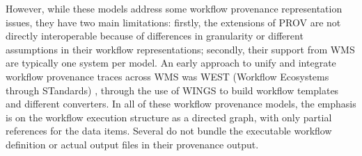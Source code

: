 \documentclass[10pt,letterpaper]{article}
\begin{document}
However, while these models address some workflow provenance representation issues, they have two main limitations: firstly, the extensions of PROV are not directly interoperable because of differences in granularity or different assumptions in their workflow representations; secondly, their support from WMS are typically one system per model.  An early approach to unify and integrate workflow provenance traces across WMS was WEST (Workflow Ecosystems through STandards) \cite{Garijo 2014}, through the use of WINGS \cite{Gil 2011} to build workflow templates and different converters. In all of these workflow provenance models, the emphasis is on the workflow execution structure as a directed graph, with only partial references for the data items. Several do not bundle the executable workflow definition or actual output files in their provenance output.
\end{document}
